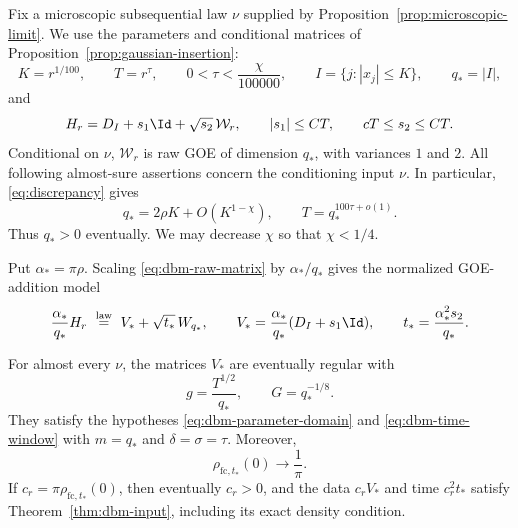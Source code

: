 Fix a microscopic subsequential law \(\nu\) supplied by
Proposition~\ref{prop:microscopic-limit}. We use the parameters and
conditional matrices of Proposition~\ref{prop:gaussian-insertion}:
\[
 K=r^{1/100},\qquad T=r^\tau,\qquad
 0<\tau<\frac{\chi}{100000},\qquad
 I=\{j:|x_j|\le K\},\qquad q_*=|I|,
\]
and
\begin{equation}
 \label{eq:dbm-raw-matrix}
 H_r=D_I+s_1\Id+\sqrt{s_2}\,\mathcal W_r,
 \qquad |s_1|\le C T,\qquad cT\le s_2\le CT.
\end{equation}
Conditional on \(\nu\), \(\mathcal W_r\) is raw GOE of dimension
\(q_*\), with variances \(1\) and \(2\). All following almost-sure
assertions concern the conditioning input \(\nu\). In particular,
\eqref{eq:discrepancy} gives
\begin{equation}
 \label{eq:dbm-dimension}
 q_*=2\rho K+O(K^{1-\chi}),
 \qquad
 T=q_*^{100\tau+o(1)}.
\end{equation}
Thus \(q_*>0\) eventually. We may decrease \(\chi\) so that
\(\chi<1/4\).

Put \(\alpha_*=\pi\rho\). Scaling \eqref{eq:dbm-raw-matrix} by
\(\alpha_*/q_*\) gives the normalized GOE-addition model
\begin{equation}
 \label{eq:dbm-normalized-matrix}
 \frac{\alpha_*}{q_*}H_r
   \ \stackrel{\mathrm{law}}{=}\
       V_*+\sqrt{t_*}\,W_{q_*},
 \qquad
 V_*=\frac{\alpha_*}{q_*}(D_I+s_1\Id),
 \qquad
 t_*=\frac{\alpha_*^2s_2}{q_*}.
\end{equation}

\begin{lemma}
\label{dbm:regularity-density}
For almost every \(\nu\), the matrices \(V_*\) are eventually regular
with
\[
 g=\frac{T^{1/2}}{q_*},\qquad G=q_*^{-1/8}.
\]
They satisfy the hypotheses
\eqref{eq:dbm-parameter-domain} and \eqref{eq:dbm-time-window} with
\(m=q_*\) and \(\delta=\sigma=\tau\). Moreover,
\[
 \rho_{\mathrm{fc},t_*}(0)\longrightarrow\frac1\pi.
\]
If \(c_r=\pi\rho_{\mathrm{fc},t_*}(0)\), then eventually \(c_r>0\),
and the data \(c_rV_*\) and time \(c_r^2t_*\) satisfy
Theorem~\ref{thm:dbm-input}, including its exact density condition.
\end{lemma}

